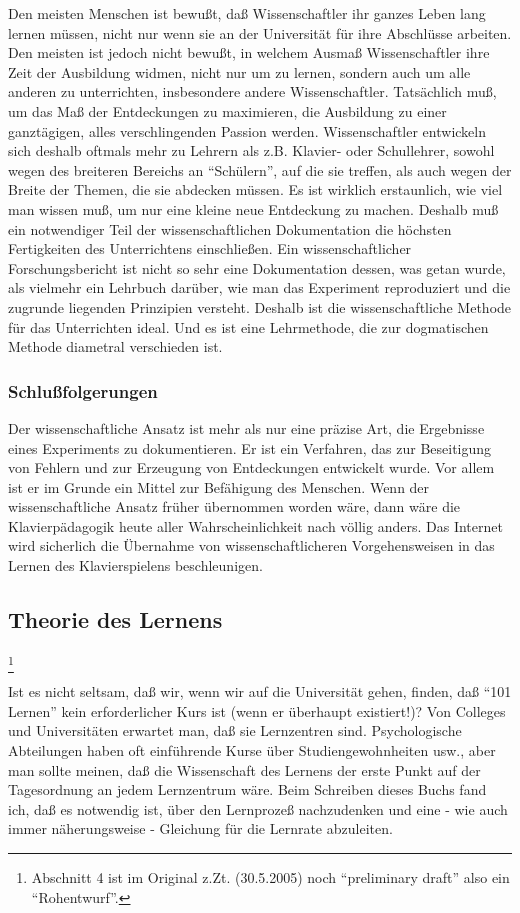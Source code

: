 Den meisten Menschen ist bewußt, daß Wissenschaftler ihr ganzes Leben lang lernen müssen, nicht nur wenn sie an der Universität für ihre Abschlüsse arbeiten.
Den meisten ist jedoch nicht bewußt, in welchem Ausmaß Wissenschaftler ihre Zeit der Ausbildung widmen, nicht nur um zu lernen, sondern auch um alle anderen zu unterrichten, insbesondere andere Wissenschaftler.
Tatsächlich muß, um das Maß der Entdeckungen zu maximieren, die Ausbildung zu einer ganztägigen, alles verschlingenden Passion werden.
Wissenschaftler entwickeln sich deshalb oftmals mehr zu Lehrern als z.B. Klavier- oder Schullehrer, sowohl wegen des breiteren Bereichs an \enquote{Schülern}, auf die sie treffen, als auch wegen der Breite der Themen, die sie abdecken müssen.
Es ist wirklich erstaunlich, wie viel man wissen muß, um nur eine kleine neue Entdeckung zu machen.
Deshalb muß ein notwendiger Teil der wissenschaftlichen Dokumentation die höchsten Fertigkeiten des Unterrichtens einschließen.
Ein wissenschaftlicher Forschungsbericht ist nicht so sehr eine Dokumentation dessen, was getan wurde, als vielmehr ein Lehrbuch darüber, wie man das Experiment reproduziert und die zugrunde liegenden Prinzipien versteht.
Deshalb ist die wissenschaftliche Methode für das Unterrichten ideal.
Und es ist eine Lehrmethode, die zur dogmatischen Methode diametral verschieden ist.


\subsubsection{Schlußfolgerungen}
\label{c3_3h}

Der wissenschaftliche Ansatz ist mehr als nur eine präzise Art, die Ergebnisse eines Experiments zu dokumentieren.
Er ist ein Verfahren, das zur Beseitigung von Fehlern und zur Erzeugung von Entdeckungen entwickelt wurde.
Vor allem ist er im Grunde ein Mittel zur Befähigung des Menschen.
Wenn der wissenschaftliche Ansatz früher übernommen worden wäre, dann wäre die Klavierpädagogik heute aller Wahrscheinlichkeit nach völlig anders.
Das Internet wird sicherlich die Übernahme von wissenschaftlicheren Vorgehensweisen in das Lernen des Klavierspielens beschleunigen.
 

\subsection{Theorie des Lernens}
\label{c3_4}

\footnote{Abschnitt 4 ist im Original z.Zt. (30.5.2005) noch \enquote{preliminary draft} also ein \enquote{Rohentwurf}.}

Ist es nicht seltsam, daß wir, wenn wir auf die Universität gehen, finden, daß \enquote{101 Lernen} kein erforderlicher Kurs ist (wenn er überhaupt existiert!)?
Von Colleges und Universitäten erwartet man, daß sie Lernzentren sind.
Psychologische Abteilungen haben oft einführende Kurse über Studiengewohnheiten usw., aber man sollte meinen, daß die Wissenschaft des Lernens der erste Punkt auf der Tagesordnung an jedem Lernzentrum wäre.
Beim Schreiben dieses Buchs fand ich, daß es notwendig ist, über den Lernprozeß nachzudenken und eine - wie auch immer näherungsweise - Gleichung für die Lernrate abzuleiten.
 


